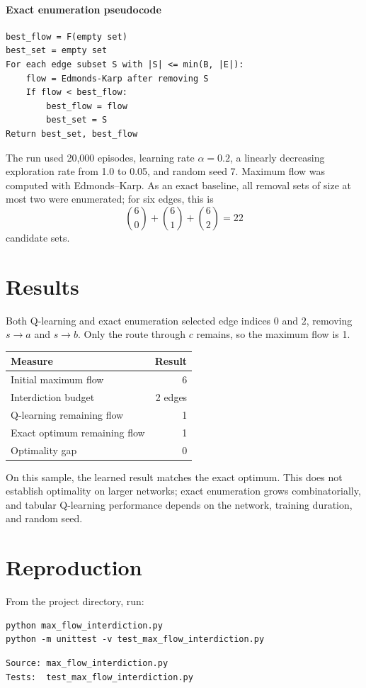 \documentclass[11pt]{article}
\begin{document}
\paragraph{Exact enumeration pseudocode}
\begin{verbatim}
best_flow = F(empty set)
best_set = empty set
For each edge subset S with |S| <= min(B, |E|):
    flow = Edmonds-Karp after removing S
    If flow < best_flow:
        best_flow = flow
        best_set = S
Return best_set, best_flow
\end{verbatim}

The run used 20,000 episodes, learning rate \(\alpha=0.2\), a linearly
decreasing exploration rate from 1.0 to 0.05, and random seed 7. Maximum flow
was computed with Edmonds--Karp. As an exact baseline, all removal sets of
size at most two were enumerated; for six edges, this is
\[
  \binom{6}{0}+\binom{6}{1}+\binom{6}{2}=22
\]
candidate sets.

\section{Results}
Both Q-learning and exact enumeration selected edge indices \(0\) and \(2\),
removing \(s \to a\) and \(s \to b\). Only the route through \(c\) remains, so
the maximum flow is 1.

\begin{center}
\begin{tabular}{l|r}
Measure & Result \\
\hline
Initial maximum flow & 6 \\
Interdiction budget & 2 edges \\
Q-learning remaining flow & 1 \\
Exact optimum remaining flow & 1 \\
Optimality gap & 0
\end{tabular}
\end{center}

On this sample, the learned result matches the exact optimum. This does not
establish optimality on larger networks; exact enumeration grows
combinatorially, and tabular Q-learning performance depends on the network,
training duration, and random seed.

\section{Reproduction}
From the project directory, run:
\begin{verbatim}
python max_flow_interdiction.py
python -m unittest -v test_max_flow_interdiction.py
\end{verbatim}
\begin{verbatim}
Source: max_flow_interdiction.py
Tests:  test_max_flow_interdiction.py
\end{verbatim}
\end{document}
